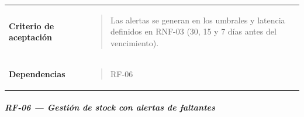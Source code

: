 \documentclass[
]{article}
\begin{document}
{\begin{longtable}[]{@{}
  >{\raggedright\arraybackslash}p{}
  >{\raggedright\arraybackslash}p{}@{}}
\textbf{Criterio de aceptación} &
\begin{minipage}[t]{\linewidth}\raggedright
\begin{quote}
Las alertas se generan en los umbrales y latencia definidos en RNF-03
(30, 15 y 7 días antes del vencimiento).
\end{quote}
\end{minipage} \\
\textbf{Dependencias} & \begin{minipage}[t]{\linewidth}\raggedright
\begin{quote}
RF-06
\end{quote}
\end{minipage} \\
\end{longtable}
}

\subparagraph{RF-06 --- Gestión de stock con alertas de
faltantes}\label{rf-06-gestiuxf3n-de-stock-con-alertas-de-faltantes}
\end{document}
